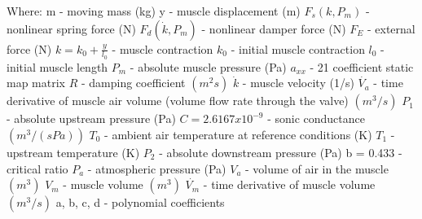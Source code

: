 \documentclass[11pt,a4paper]{article}
\begin{document}
\begin{appendices}
Where: \newline
m - moving mass (kg)\newline
y - muscle displacement (m)\newline
$F_s(k, P_m)$ - nonlinear spring force (N)\newline
$F_d(\dot{k}, P_m)$ - nonlinear damper force (N)\newline
$F_E$ - external force (N)\newline
$k = k_0 + \frac{y}{l_0}$ - muscle contraction\newline
$k_0$ - initial muscle contraction\newline
$l_0$ - initial muscle length\newline
$P_m$ - absolute muscle pressure (Pa)\newline
$a_{xx}$ - 21 coefficient static map matrix\newline
$R$ - damping coefficient $(m^2s)$\newline
$\dot{k}$ - muscle velocity (1/s)\newline
$\dot{V_a}$ - time derivative of muscle air volume (volume flow rate through the valve) $(m^3/s)$
$P_1$ - absolute upstream pressure (Pa)\newline
$C = 2.6167x10^{-9}$ - sonic conductance $(m^3/(sPa))$\newline
$T_0$ - ambient air temperature at reference conditions (K)\newline
$T_1$ - upstream temperature (K)\newline
$P_2$ - absolute downstream pressure (Pa)\newline
b = 0.433 - critical ratio\newline
$P_a$ - atmospheric pressure (Pa)\newline
$V_a$ - volume of air in the muscle $(m^3)$\newline
$V_m$ - muscle volume $(m^3)$\newline
$\dot{V_m}$ - time derivative of muscle volume $(m^3/s)$\newline
a, b, c, d - polynomial coefficients


\newpage
\end{appendices}

\printbibliography
\end{document}
